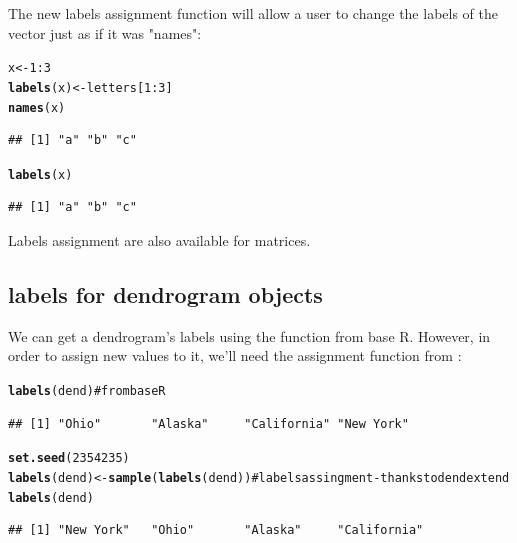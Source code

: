 \documentclass[shortnames,nojss,article]{jss}\usepackage{graphicx, color}
\makeatletter
\newcommand{\hlfunctioncall}[1]{\textcolor[rgb]{0.501960784313725,0,0.329411764705882}{\textbf{#1}}}%
\newcommand{\hlcomment}[1]{\textcolor[rgb]{0.180392156862745,0.6,0.341176470588235}{#1}}%
\newenvironment{kframe}{%
 \def\at@end@of@kframe{}%
 \ifinner\ifhmode%
  \def\at@end@of@kframe{\end{minipage}}%
  \begin{minipage}{\columnwidth}%
 \fi\fi%
 \def\FrameCommand##1{\hskip\@totalleftmargin \hskip-\fboxsep
 \colorbox{shadecolor}{##1}\hskip-\fboxsep
     \hskip-\linewidth \hskip-\@totalleftmargin \hskip\columnwidth}%
 \MakeFramed {\advance\hsize-\width
   \@totalleftmargin\z@ \linewidth\hsize
   \@setminipage}}%
 {\par\unskip\endMakeFramed%
 \at@end@of@kframe}
\newenvironment{knitrout}{}{} %
\makeatother
\begin{document}
The new labels assignment function will allow a user to change the labels of the vector just as if it was "names":

\begin{knitrout}
\color{fgcolor}\begin{kframe}
\begin{alltt}
x <- 1:3
\hlfunctioncall{labels}(x) <- letters[1:3]
\hlfunctioncall{names}(x)
\end{alltt}
\begin{verbatim}
## [1] "a" "b" "c"
\end{verbatim}
\begin{alltt}
\hlfunctioncall{labels}(x)
\end{alltt}
\begin{verbatim}
## [1] "a" "b" "c"
\end{verbatim}
\end{kframe}
\end{knitrout}


Labels assignment are also available for matrices.


\subsection{labels for dendrogram objects}

We can get a dendrogram's labels using the  function from base R. However, in order to assign new values to it, we'll need the assignment function from :

\begin{knitrout}
\color{fgcolor}\begin{kframe}
\begin{alltt}
\hlfunctioncall{labels}(dend)  \hlcomment{# from base R}
\end{alltt}
\begin{verbatim}
## [1] "Ohio"       "Alaska"     "California" "New York"
\end{verbatim}
\begin{alltt}
\hlfunctioncall{set.seed}(2354235)
\hlfunctioncall{labels}(dend) <- \hlfunctioncall{sample}(\hlfunctioncall{labels}(dend))  \hlcomment{# labels assingment - thanks to dendextend}
\hlfunctioncall{labels}(dend)
\end{alltt}
\begin{verbatim}
## [1] "New York"   "Ohio"       "Alaska"     "California"
\end{verbatim}
\end{kframe}
\end{knitrout}
\end{document}
